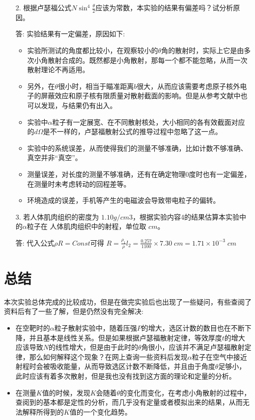 \documentclass[utf8]{ctexart}
\begin{document}
\begin{itemize}
   \item [2.] 根据卢瑟福公式$N\sin^4{\frac{\theta}{2}}$应该为常数，本实验的结果有偏差吗？试分析原因。
   \item [ ] 答: 实验结果有一定偏差，原因如下:
   \begin{itemize}
   	\item 实验所测试的角度都比较小，在观察较小的$\theta$角的散射时，实际上它是由多次小角散射合成的。既然都是小角散射，那每一个都不能忽略，从而一次散射理论不再适用\cite{bk2}。
   	\item 另外，在$\theta$很小时，相当于瞄准距离$b$很大，从而应该需要考虑原子核外电子的屏蔽效应和原子核有限质量对散射截面的影响\cite{art1}。但是从参考文献\cite{art1}中也可以发现，与结果仍有出入。
   	\item 实验中$\alpha$粒子有一定展宽\cite{art2}、在不同散射核处，大小相同的各有效截面对应的$d\Omega$是不一样的，卢瑟福散射公式的推导过程中忽略了这一点。
   	\item 实验中的系统误差，从而使得我们的测量不够准确，比如计数不够准确、真空并非“真空”。
   	\item 测量误差，对长度的测量不够准确，还有在确定物理0度时也有一定偏差，在测量时未考虑转动的回程差等。
   	\item 环境造成的误差，手机等产生的电磁波会导致带电粒子的偏转。
   \end{itemize}
   \item [3.] 若人体肌肉组织的密度为 $1.10g/cm3$，根据实验内容4的结果估算本实验中的$\alpha$粒子在
   人体肌肉组织中的射程，单位取 $cm$。
   \item [ ] 答: 代入公式$\rho R = Const$可得 $R = \frac{\rho_1}{\rho}l_2 = 
   \frac{0.257}{1100} \times 7.30 \; cm = 1.71 \times 10^{-3} \; cm $
\end{itemize}

\section*{总结}
本次实验总体完成的比较成功，但是在做完实验后也出现了一些疑问，有些查阅了资料后有了一些了解，但是仍然没有完全解决:
\begin{itemize}
	\item 在空靶时的$\alpha$粒子散射实验中，随着压强$P$的增大，选区计数的数目也在不断下降，并且基本是线性关系。但是如果根据卢瑟福散射定律，等效厚度$t$的增大应该导致$N$的线性增大，但是由于此时的$\theta$角很小，应该并不满足卢瑟福散射定律，那么如何解释这个现象？在网上查询一些资料后发现$\alpha$粒子在空气中接近射程时会被吸收能量，从而导致选区计数不断降低，并且由于角度$\theta$足够小，此时应该有着多次散射，但是我也没有找到这方面的理论和定量的分析。
	\item 在测量$K$值的时候，发现$K$会随着$\theta$的变化而变化，在考虑小角散射的过程中，查阅到的基本都是定性的分析，而几乎没有定量或者模拟出来的结果，从而无法解释所得到的$K$值的一个变化趋势。
\end{itemize}






\label{unknown}
\end{document}

